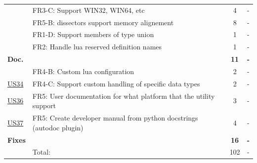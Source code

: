 \begin{table}[!htb]
\begin{tabularx}{\textwidth}{l X c c}
	 & FR3-C: Support WIN32, WIN64, \GLS{sparc} etc & 4 & - \\
	 & FR5-B: \Glspl{dissector} support memory alignement & 8 & - \\
	 & FR1-D: Support members of type \gls{union} & 1 & - \\
	 & FR2: Handle \Gls{lua} reserved definition names & 1 & - \\
	\addlinespace
	\textbf{Doc.} &  & \textbf{11} & \textbf{-} \\
	 & FR4-B: Custom \Gls{lua} configuration & 2 & - \\
	\hyperref[tab:req:stories8]{US34} & FR4-C: Support custom handling of specific data types & 2 & - \\
	\hyperref[tab:req:stories9]{US36} & FR5: User documentation for what platform that the \gls{utility} support & 3 & - \\
	\hyperref[tab:req:stories9]{US37} & FR5: Create developer manual from python docstrings (autodoc plugin) & 4 & - \\
	\addlinespace
	\textbf{Fixes} &  & \textbf{16} & \textbf{-} \\
	\midrule
	& Total: & 102 &  -\\
	\bottomrule
\end{tabularx}
\end{table}


